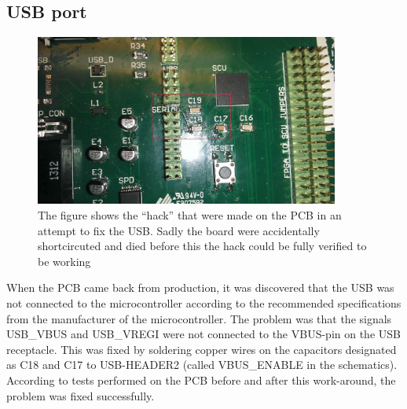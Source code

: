 \subsection{ USB port }

\begin{figure}[H]
\centering
\includegraphics[width=10cm,keepaspectratio]{pcb/vreghack.jpg}
\caption{The figure shows the ``hack'' that were made on the PCB in an attempt to fix the USB. Sadly the board were accidentally shortcircuted and died before this the hack could be fully verified to be working}
\label{figure:vreghack}
\end{figure}

When the PCB came back from production, it was discovered that the USB was not connected to the microcontroller
according to the recommended specifications from the manufacturer of the microcontroller. 
The problem was that the signals USB\_VBUS and USB\_VREGI were not connected to the VBUS-pin on the USB receptacle. This was fixed by soldering copper wires on the capacitors designated as C18 and C17 to USB-HEADER2 (called VBUS\_ENABLE in the schematics).
According to tests performed on the PCB before and after this work-around, the problem was fixed successfully.
